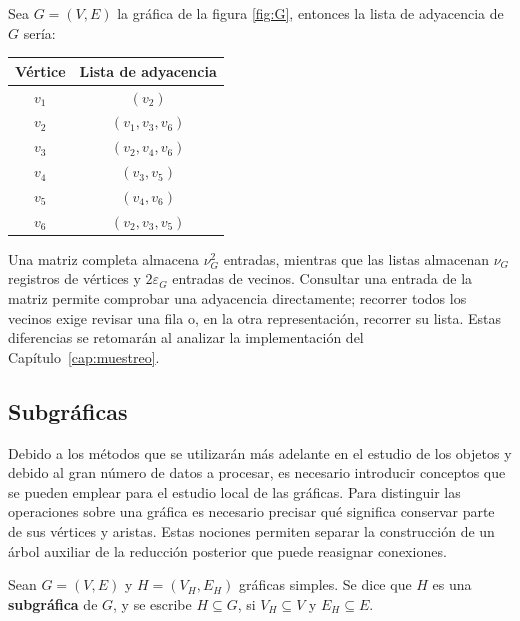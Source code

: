 \begin{example}
    Sea $G = (V,E)$ la gráfica de la figura \ref{fig:G}, entonces la lista de adyacencia de $G$ sería:
    \begin{center}
        \begin{tabular}{c|c}
            Vértice & Lista de adyacencia \\
            \hline
            $v_1$ & $(v_2)$ \\
            $v_2$ & $(v_1, v_3, v_6)$ \\
            $v_3$ & $(v_2, v_4, v_6)$ \\
            $v_4$ & $(v_3, v_5)$ \\
            $v_5$ & $(v_4, v_6)$ \\
            $v_6$ & $(v_2, v_3, v_5)$
        \end{tabular}
    \end{center}
\end{example}

Una matriz completa almacena $\nu_G^2$ entradas, mientras que las listas almacenan $\nu_G$ registros de vértices y $2\varepsilon_G$ entradas de vecinos. Consultar una entrada de la matriz permite comprobar una adyacencia directamente; recorrer todos los vecinos exige revisar una fila o, en la otra representación, recorrer su lista. Estas diferencias se retomarán al analizar la implementación del Capítulo~\ref{cap:muestreo}.

\subsection{Subgráficas}

Debido a los métodos que se utilizarán más adelante en el estudio de los objetos y debido al gran número de datos a procesar, es necesario introducir conceptos que se pueden emplear para el estudio local de las gráficas.
Para distinguir las operaciones sobre una gráfica es necesario precisar qué significa conservar parte de sus vértices y aristas. Estas nociones permiten separar la construcción de un árbol auxiliar de la reducción posterior que puede reasignar conexiones.

\begin{definition}[Subgráfica]
\label{def:subgrafica}
Sean $G=(V,E)$ y $H=(V_H,E_H)$ gráficas simples. Se dice que $H$ es una \textbf{subgráfica} de $G$, y se escribe $H\subseteq G$, si $V_H\subseteq V$ y $E_H\subseteq E$.
\end{definition}

